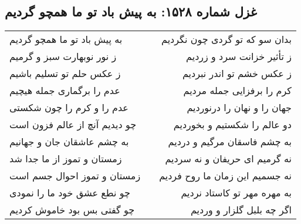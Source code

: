 \begin{center}
\section*{غزل شماره ۱۵۲۸: به پیش باد تو ما همچو گردیم}
\label{sec:1528}
\begin{longtable}{l p{0.5cm} r}
به پیش باد تو ما همچو گردیم
&&
بدان سو که تو گردی چون نگردیم
\\
ز نور نوبهارت سبز و گرمیم
&&
ز تأثیر خزانت سرد و زردیم
\\
ز عکس حلم تو تسلیم باشیم
&&
ز عکس خشم تو اندر نبردیم
\\
عدم را برگماری جمله هیچیم
&&
کرم را برفزایی جمله مردیم
\\
عدم را و کرم را چون شکستی
&&
جهان را و نهان را درنوردیم
\\
چو دیدیم آنچ از عالم فزون است
&&
دو عالم را شکستیم و بخوردیم
\\
به چشم عاشقان جان و جهانیم
&&
به چشم فاسقان مرگیم و دردیم
\\
زمستان و تموز از ما جدا شد
&&
نه گرمیم ای حریفان و نه سردیم
\\
زمستان و تموز احوال جسم است
&&
نه جسمیم این زمان ما روح فردیم
\\
چو نطع عشق خود ما را نمودی
&&
به مهره مهر تو کاستاد نردیم
\\
چو گفتی بس بود خاموش کردیم
&&
اگر چه بلبل گلزار و وردیم
\\
\end{longtable}
\end{center}
